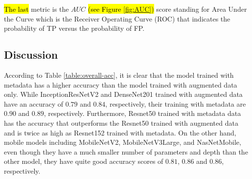 \documentclass[sensors,article,accept,pdftex,moreauthors]{Definitions/mdpi}
\begin{document}
	\hl{The last} %
 metric is the $AUC$ \hl{(see Figure \mbox{\ref{fig:AUC}})} score standing for Area Under the Curve which is the Receiver Operating Curve (ROC) that indicates the probability of TP versus the probability of FP.  
	
	\subsection{Discussion} 

	
	According to Table \ref{table:overall-acc}, it is clear that the model trained with metadata has a higher accuracy than the model trained with augmented data only. While InceptionResNetV2 and DenseNet201 trained with augmented data have an accuracy of $0.79$ and $0.84$, respectively, their training with metadata are $0.90$ and $0.89$, respectively. Furthermore, Resnet50 trained with metadata data has the accuracy that outperforms the Resnet50 trained with augmented data and is twice as high as Resnet152 trained with metadata. On the other hand, mobile models including MobileNetV2, MobileNetV3Large, and NasNetMobile, even though they have a much smaller number of parameters and depth than the other model, they have quite good accuracy scores of $0.81$, $0.86$ and $0.86$, respectively. 
	
\end{document}
